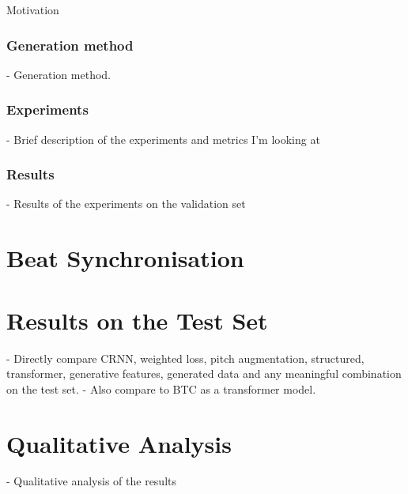 Motivation

\subsubsection{Generation method} 
- Generation method. 
\subsubsection{Experiments}
- Brief description of the experiments and metrics I'm looking at
\subsubsection{Results}
- Results of the experiments on the validation set

\section{Beat Synchronisation}\label{sec:beat-synchronisation}

\section{Results on the Test Set}\label{sec:test-set}

- Directly compare CRNN, weighted loss, pitch augmentation, structured, transformer, generative features, generated data and any meaningful combination on the test set.
- Also compare to BTC as a transformer model.


\section{Qualitative Analysis}
- Qualitative analysis of the results
